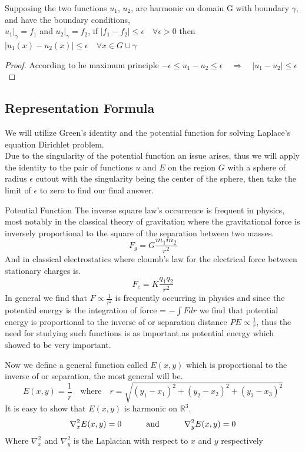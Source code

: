 \begin{theorem}
    Supposing the two functions $u_1$, $u_2$, are harmonic on domain G with boundary $\gamma$, and have the boundary conditions, 
    \\
    $u_1|_\gamma = f_1$ and $u_2|_\gamma = f_2$, if $|f_1 - f_2| \leq \epsilon  \quad \forall \epsilon > 0$ then $|u_1(x) - u_2(x)| \leq \epsilon \quad \forall x \in G \cup \gamma $
\end{theorem}
\begin{proof}[\textcolor{theme}{Proof}]
    According to he maximum principle $-\epsilon \leq u_1 - u_2 \leq \epsilon \quad \Rightarrow \quad |u_1 - u_2| \leq \epsilon$
\end{proof}
\newpage
\setcounter{equation}{0}
\subsection{Representation Formula}
We will utilize Green's identity and the potential function for solving Laplace's equation Dirichlet problem. 
\\
Due to the singularity of the potential function an issue arises, 
thus we will apply the identity to the pair of functions $u$ and $E$ on the region $G$ 
with a sphere of radius $\epsilon$ cutout with the singularity being the center of the sphere, 
then take the limit of $\epsilon$ to zero to find our final answer.

\begin{enrichment*}{Potential Function}
    The inverse square law's occurrence is frequent in physics, most notably in the classical theory of gravitation where the gravitational force is inversely proportional to the square of the separation between two masses.
\[
    F_g = G\frac{m_1 m_2}{r^2}    
\]
And in classical electrostatics where cloumb's law for the electrical force between stationary charges is.
\[
    F_e = K\frac{q_1 q_2}{r^2}    
\]
In general we find that $\displaystyle F \propto \frac{1}{r^2}$ is frequently occurring in physics and since the potential energy is the integration of force
= $\displaystyle -\int F dr$ we find that potential energy is proportional to the inverse of or separation distance $\displaystyle PE \propto \frac{1}{r}$, thus the need for studying such functions is as important as potential energy which showed to be very important.
\par
Now we define a general function called $E(x,y)$ which is proportional to the inverse of or separation, the most general will be.
\[
    E(x,y) = \frac{1}{r} \quad \text{where} \quad r = \sqrt{(y_1-x_1)^2 + (y_2-x_2)^2 + (y_3-x_3)^2}    
\]
It is easy to show that $E(x,y)$ is harmonic on $\mathbb{R}^3$.
\[
    \nabla_{x}^{2} E(x,y) = 0 \quad\quad\quad \text{and} \quad\quad\quad \nabla_{y}^{2} E(x,y) = 0    
\]
Where $\nabla_{x}^{2}$ and $\nabla_{y}^{2}$ is the Laplacian with respect to $x$ and $y$ respectively
\end{enrichment*}

